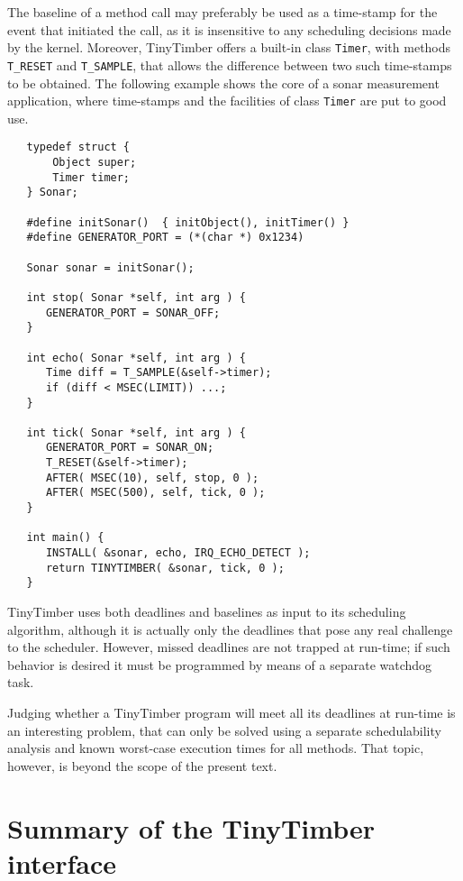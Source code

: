 \documentclass[12pt]{article}
\begin{document}
The baseline of a method call may preferably be used as a time-stamp for the event that initiated the call, as it is insensitive to any scheduling decisions made by the kernel. Moreover, TinyTimber offers a built-in class {\tt Timer}, with methods {\tt T\_RESET} and {\tt T\_SAMPLE}, that allows the difference between two such time-stamps to be obtained. The following example shows the core of a sonar measurement application, where time-stamps and the facilities of class {\tt Timer} are put to good use.
\begin{verbatim}
   typedef struct {
       Object super;
       Timer timer;
   } Sonar;
   
   #define initSonar()  { initObject(), initTimer() }
   #define GENERATOR_PORT = (*(char *) 0x1234)
   
   Sonar sonar = initSonar();
      
   int stop( Sonar *self, int arg ) {
      GENERATOR_PORT = SONAR_OFF;
   }
   
   int echo( Sonar *self, int arg ) {
      Time diff = T_SAMPLE(&self->timer);
      if (diff < MSEC(LIMIT)) ...;
   }
   
   int tick( Sonar *self, int arg ) {
      GENERATOR_PORT = SONAR_ON;
      T_RESET(&self->timer);
      AFTER( MSEC(10), self, stop, 0 );
      AFTER( MSEC(500), self, tick, 0 );
   }
   
   int main() {
      INSTALL( &sonar, echo, IRQ_ECHO_DETECT );
      return TINYTIMBER( &sonar, tick, 0 );
   }
\end{verbatim}

TinyTimber uses both deadlines and baselines as input to its scheduling algorithm, although it is actually only the deadlines that pose any real challenge to the scheduler.  However, missed deadlines are not trapped at run-time; if such behavior is desired it must be programmed by means of a separate watchdog task.

Judging whether a TinyTimber program will meet all its deadlines at run-time is an interesting problem, that can only be solved using a separate schedulability analysis and known worst-case execution times for all methods.  That topic, however, is beyond the scope of the present text.


\section{Summary of the TinyTimber interface}
\end{document}
